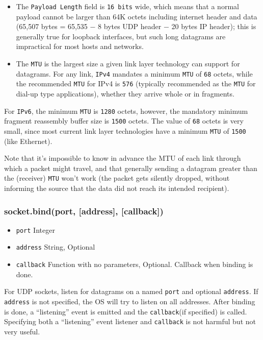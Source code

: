 \begin{itemize}
\item
  The \texttt{Payload Length} field is \texttt{16 bits} wide, which
  means that a normal payload cannot be larger than 64K octets including
  internet header and data (65,507 bytes = 65,535 − 8 bytes UDP header −
  20 bytes IP header); this is generally true for loopback interfaces,
  but such long datagrams are impractical for most hosts and networks.
\item
  The \texttt{MTU} is the largest size a given link layer technology can
  support for datagrams. For any link, \texttt{IPv4} mandates a minimum
  \texttt{MTU} of \texttt{68} octets, while the recommended \texttt{MTU}
  for IPv4 is \texttt{576} (typically recommended as the \texttt{MTU}
  for dial-up type applications), whether they arrive whole or in
  fragments.
\end{itemize}

For \texttt{IPv6}, the minimum \texttt{MTU} is \texttt{1280} octets,
however, the mandatory minimum fragment reassembly buffer size is
\texttt{1500} octets. The value of \texttt{68} octets is very small,
since most current link layer technologies have a minimum \texttt{MTU}
of \texttt{1500} (like Ethernet).

Note that it's impossible to know in advance the MTU of each link
through which a packet might travel, and that generally sending a
datagram greater than the (receiver) \texttt{MTU} won't work (the packet
gets silently dropped, without informing the source that the data did
not reach its intended recipient).

\subsubsection{socket.bind(port, {[}address{]},
{[}callback{]})}\label{socket.bindport-address-callback}

\begin{itemize}
\itemsep1pt\parskip0pt
\item
  \texttt{port} Integer
\item
  \texttt{address} String, Optional
\item
  \texttt{callback} Function with no parameters, Optional. Callback when
  binding is done.
\end{itemize}

For UDP sockets, listen for datagrams on a named \texttt{port} and
optional \texttt{address}. If \texttt{address} is not specified, the OS
will try to listen on all addresses. After binding is done, a
``listening'' event is emitted and the \texttt{callback}(if specified)
is called. Specifying both a ``listening'' event listener and
\texttt{callback} is not harmful but not very useful.

